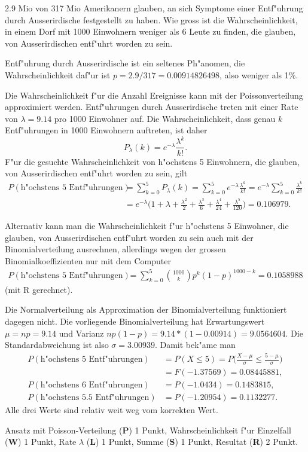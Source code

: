 2.9 Mio von 317 Mio Amerikanern glauben, an sich Symptome einer 
Entf"uhrung durch Ausserirdische festgestellt zu haben.
Wie gross ist die Wahrscheinlichkeit, in einem Dorf mit 1000
Einwohnern weniger als 6 Leute zu finden, die glauben, von
Ausserirdischen entf"uhrt worden zu sein.

\begin{loesung}
Entf"uhrung durch Ausserirdische ist ein seltenes Ph"anomen,
die Wahrscheinlichkeit daf"ur ist $p=2.9/317=0.00914826498$, also
weniger als 1\%.

Die Wahrscheinlichkeit f"ur die Anzahl Ereignisse kann mit der
Poissonverteilung approximiert werden. Entf"uhrungen durch
Ausserirdische treten mit einer Rate von $\lambda = 9.14$ pro 1000 Einwohner
auf. Die Wahrscheinlichkeit, dass genau $k$ Entf"uhrungen in 1000
Einwohnern auftreten, ist daher
\[
P_\lambda(k)=e^{-\lambda}\frac{\lambda^k}{k!}.
\]
F"ur die gesuchte Wahrscheinlichkeit von h"ochstens 5 Einwohnern, die glauben,
von Ausserirdischen entf"uhrt worden zu sein, gilt
\begin{align*}
P(\text{h"ochstens 5 Entf"uhrungen})
&=
\sum_{k=0}^5P_\lambda(k)=\sum_{k=0}^5 e^{-\lambda}\frac{\lambda^k}{k!}
=e^{-\lambda}\sum_{k=0}^5\frac{\lambda^k}{k!}
\\
&=e^{-\lambda}\biggl(
1+\lambda+\frac{\lambda^2}{2}+\frac{\lambda^3}{6}+\frac{\lambda^4}{24}+\frac{\lambda^5}{120}
\biggr)
=0.106979.
\end{align*}

Alternativ kann man die Wahrscheinlichkeit f"ur h"ochstens 5 Einwohner, die
glauben, von Ausserirdischen entf"uhrt worden zu sein auch mit der
Binomialverteilung ausrechnen, allerdings wegen der grossen
Binomialkoeffizienten nur mit dem Computer
\begin{align*}
P(\text{h"ochstens 5 Entf"uhrungen})
&=
\sum_{k=0}^5\binom{1000}{k}p^k(1-p)^{1000-k}
=0.1058988
\end{align*}
(mit R gerechnet).

Die Normalverteilung als Approximation der Binomialverteilung funktioniert
dagegen nicht. Die vorliegende Binomialverteilung hat Erwartungswert
$\mu = np=9.14$ und Varianz $np(1-p)=9.14 * (1-0.00914)=9.0564604$.
Die Standardabweichung ist also $\sigma = 3.00939$. Damit bek"ame man
\begin{align*}
P(\text{h"ochstens 5 Entf"uhrungen})
&=
P(X\le 5)=P\biggl(\frac{X-\mu}{\sigma}\le \frac{5-\mu}{\sigma}\biggr)\\
&=F(-1.37569)=0.08445881,
\\
P(\text{h"ochstens 6 Entf"uhrungen})
&=P(-1.0434)=0.1483815,
\\
P(\text{h"ochstens 5.5 Entf"uhrungen})
&=P(-1.20954)=0.1132277.
\end{align*}
Alle drei Werte sind relativ weit weg vom korrekten Wert.
\end{loesung}

\begin{bewertung}
Ansatz mit Poisson-Verteilung ({\bf P}) 1 Punkt,
Wahrscheinlichkeit f"ur Einzelfall ({\bf W}) 1 Punkt,
Rate $\lambda$ ({\bf L}) 1 Punkt,
Summe ({\bf S}) 1 Punkt,
Resultat ({\bf R}) 2 Punkt.
\end{bewertung}

